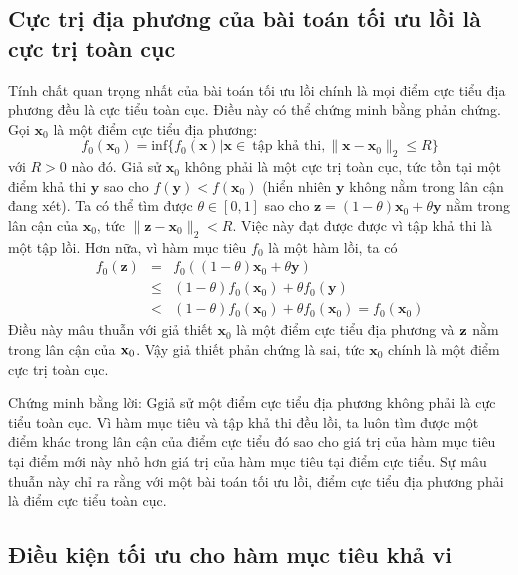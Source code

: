 

\subsection{Cực trị địa phương của bài toán tối ưu lồi là cực trị toàn cục}

Tính chất quan trọng nhất của bài toán tối ưu lồi chính là mọi điểm cực tiểu địa phương đều là cực tiểu toàn cục. Điều này có thể chứng minh bằng phản chứng. Gọi
$\mathbf{x}_0$ là một điểm cực tiểu địa phương:
\begin{equation*}
f_0(\mathbf{x}_0) = \text{inf} \{f_0(\mathbf{x}) | \mathbf{x} \in
~\text{tập khả thi}, \|\mathbf{x} - \mathbf{x}_0\|_2 \leq R\} \end{equation*}
với $R > 0$ nào đó. Giả sử $\mathbf{x}_0$ không phải là một cực trị toàn cục, tức tồn tại một điểm khả thi $\mathbf{y}$
sao cho $f(\mathbf{y}) < f(\mathbf{x}_0)$ (hiển nhiên $\mathbf{y}$ không
nằm trong lân cận đang xét). Ta có thể tìm được $\theta \in [0, 1]$ sao
cho $\mathbf{z} = (1 - \theta)\mathbf{x}_0 + \theta\mathbf{y}$ nằm trong lân cận
của $\mathbf{x}_0$, tức $\|\mathbf{z} - \mathbf{x}_0\|_2 < R$. Việc này đạt được được
vì tập khả thi là một tập lồi. Hơn nữa, vì {hàm mục tiêu} $f_0$ là một
hàm lồi, ta có
\begin{eqnarray}
f_0(\mathbf{z}) &=& f_0((1 - \theta)\mathbf{x}_0 + \theta \mathbf{y})  \\\
&\leq& (1 - \theta)f_0(\mathbf{x}_0) + \theta f_0(\mathbf{y})\\\
& < & (1 - \theta)f_0(\mathbf{x}_0) + \theta f_0(\mathbf{x}_0)
= f_0(\mathbf{x}_0)
\end{eqnarray}
Điều này mâu thuẫn với giả thiết $\mathbf{x}_0$ là một điểm cực tiểu địa phương và $\mathbf{z}$ nằm trong lân cận của $\mathbf{x}_0$. Vậy giả thiết phản chứng là
sai, tức $\mathbf{x}_0$ chính là một điểm cực trị toàn cục. \dpcm

Chứng minh bằng lời: Ggiả sử một điểm cực tiểu địa phương không phải là cực tiểu toàn cục. Vì hàm mục tiêu và tập khả thi đều lồi, ta luôn tìm được một điểm khác trong lân cận của điểm cực tiểu đó
sao cho giá trị của hàm mục tiêu tại điểm mới này nhỏ hơn giá trị của hàm mục
tiêu tại điểm cực tiểu. Sự mâu thuẫn này chỉ ra rằng với một bài toán tối ưu
lồi, điểm cực tiểu địa phương phải là điểm cực tiểu toàn cục.



\subsection{Điều kiện tối ưu cho hàm mục tiêu khả vi}

